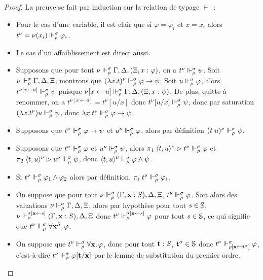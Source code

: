 \documentclass{article}
\begin{document}
\begin{proof}
  La preuve se fait par induction sur la relation de typage $\vdash$~:
  \begin{itemize}
  \item Pour le cas d'une variable, il est clair que si $\varphi = \varphi_i$ et $x = x_i$ alors $t^\nu = \nu(x_i)\Vdash_\rho^\sigma \varphi_i$.
  \item Le cas d'un affaiblissement est direct aussi.
  \item Supposons que pour tout $\nu \Vdash_\rho^\sigma \Gamma,\Delta,(\Xi, x : \varphi)$, on a $t^\nu \Vdash_\rho^\sigma \psi$. Soit $\nu \Vdash_\rho^\sigma \Gamma,\Delta,\Xi$, montrons que $(\lambda x.t)^\nu\Vdash_\rho^\sigma \varphi \to \psi$. Soit $u \Vdash_\rho^\sigma \varphi$, alors $t^{\nu[x \leftarrow u]}\Vdash_\rho^\sigma \psi$ puisque $\nu[x\leftarrow u]\Vdash_\rho^\sigma \Gamma,\Delta,(\Xi, x : \psi)$. De plus, quitte à renommer, on a $t^{\nu[x\leftarrow u]} = t^\nu[u/x]$ donc $t^\nu[u/x]\Vdash_\rho^\sigma \psi$, donc par saturation $(\lambda x.t^\nu) u \Vdash_\rho^\sigma \psi$, donc $\lambda x.t^\nu\Vdash_\rho^\sigma \varphi\to\psi$.
  \item Supposons que $t^\nu\Vdash_\rho^\sigma \varphi \to \psi$ et $u^\nu\Vdash_\rho^\sigma \varphi$, alors par définition $(t\;u)^\nu\Vdash_\rho^\sigma \psi$.
  \item Supposons que $t^\nu\Vdash_\rho^\sigma \varphi$ et $u^\nu\Vdash_\rho^\sigma \psi$, alors $\pi_1\;\langle t,u\rangle^\nu \rhd t^\nu \Vdash_\rho^\sigma \varphi$ et $\pi_2\;\langle t,u\rangle^\nu\rhd u^\nu \Vdash_\rho^\sigma \psi$, donc $\langle t,u\rangle^\nu \Vdash_\rho^\sigma \varphi\land\psi$.
  \item Si $t^\nu \Vdash_\rho^\sigma \varphi_1\land\varphi_2$ alors par définition, $\pi_i\;t^\nu\Vdash_\rho^\sigma \varphi_i$.
  \item On suppose que pour tout $\nu\Vdash_\rho^\sigma (\Gamma, \mathbf{x} : S), \Delta,\Xi$, $t^\nu\Vdash_\rho^\sigma \varphi$. Soit alors des valuations $\nu\Vdash_\rho^\sigma \Gamma,\Delta,\Xi$, alors par hypothèse pour tout $s \in \mathbb{S}$, $\nu\Vdash_\rho^{\sigma[\mathbf{x}\leftarrow s]}(\Gamma, \mathbf{x} : S), \Delta, \Xi$ donc $t^\nu\Vdash_\rho^{\sigma[\mathbf{x} \leftarrow s]}\varphi$ pour tout $s\in \mathbb{S}$, ce qui signifie que $t^\nu \Vdash_\rho^\sigma \forall \mathbf{x}^S, \varphi$.
  \item On suppose que $t^\nu\Vdash_\rho^\sigma \forall \mathbf{x}, \varphi$, donc pour tout $\mathbf{t} : S$, $\mathbf{t}^\sigma \in \mathbb S$ donc $t^\nu\Vdash_{\rho[\mathbf{x}\leftarrow \mathbf{t}^\sigma]}^\sigma \varphi$, c'est-à-dire $t^\nu\Vdash_\rho^\sigma \varphi[\mathbf{t}/\mathbf{x}]$ par le lemme de substitution du premier ordre.

\end{itemize}
\end{proof}
\end{document}
